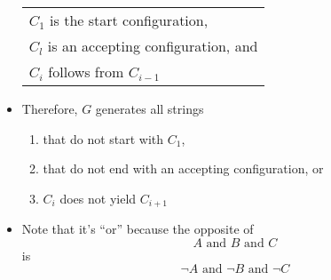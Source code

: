 \begin{frame}[allowframebreaks]
\begin{itemize}
\begin{center}
\begin{tabular}{l}
    $C_1$  is the start configuration,\\
    $C_l$ is an accepting configuration, and\\
    $C_i$ follows from $C_{i-1}$
  \end{tabular}
\end{center}
\item  Therefore, $G$ generates all strings
  \begin{enumerate}
  \item that do not start with $C_1$,
  \item that do not end with an accepting configuration, \alert{or}
  \item $C_i$ does not yield $C_{i+1}$
  \end{enumerate}
\item Note that it's ``or'' because the opposite of
  \begin{equation*}
    A \text{ and } B \text{ and } C
  \end{equation*}
  is
  \begin{equation*}
    \neg A \text{ and } \neg B \text{ and } \neg C
  \end{equation*}


\end{itemize}
\end{frame}
